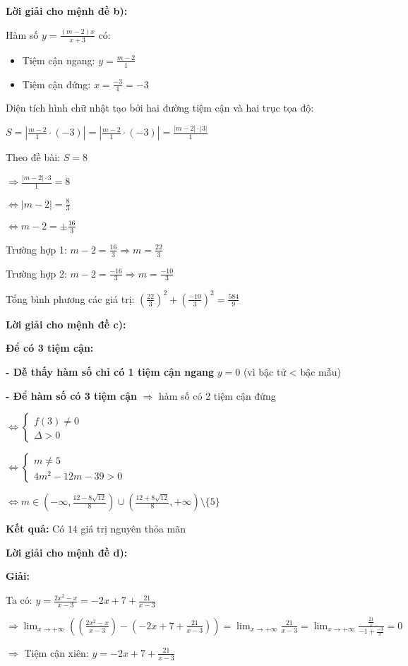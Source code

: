 \documentclass{article}
\begin{document}
\textbf{Lời giải cho mệnh đề b):}

Hàm số \(y = \frac{(m - 2)x}{x + 3}\) có:

\begin{itemize}
\item Tiệm cận ngang: \(y = \frac{m - 2}{1}\)
\item Tiệm cận đứng: \(x = \frac{-3}{1} = -3\)
\end{itemize}

Diện tích hình chữ nhật tạo bởi hai đường tiệm cận và hai trục tọa độ:

\(S = \left| \frac{m - 2}{1} \cdot (-3) \right| = \left| \frac{m - 2}{1} \cdot (-3) \right| = \frac{|m - 2| \cdot |3|}{1}\)

Theo đề bài: \(S = 8\)

\(\Rightarrow \frac{|m - 2| \cdot 3}{1} = 8\)

\(\Leftrightarrow |m - 2| = \frac{8}{3}\)

\(\Leftrightarrow m - 2 = \pm \frac{16}{3}\)

Trường hợp 1: \(m - 2 = \frac{16}{3} \Rightarrow m = \frac{22}{3}\)

Trường hợp 2: \(m - 2 = \frac{-16}{3} \Rightarrow m = \frac{-10}{3}\)

Tổng bình phương các giá trị: \((\frac{22}{3})^2 + (\frac{-10}{3})^2 = \frac{584}{9}\)

\textbf{Lời giải cho mệnh đề c):}

\textbf{Để có 3 tiệm cận:}

\textbf{- Dễ thấy hàm số chỉ có 1 tiệm cận ngang} \(y = 0\) (vì bậc tử < bậc mẫu)

\textbf{- Để hàm số có 3 tiệm cận} \(\Rightarrow\) hàm số có 2 tiệm cận đứng

\(\Leftrightarrow \begin{cases}
f(3) \neq 0 \\
\Delta > 0
\end{cases}\)

\(\Leftrightarrow \begin{cases}
m \neq 5 \\
4m^2 - 12m - 39 > 0
\end{cases}\)

\(\Leftrightarrow m \in (-\infty, \frac{12 - 8\sqrt{12}}{8}) \cup (\frac{12 + 8\sqrt{12}}{8}, +\infty) \setminus \{5\}\)

\textbf{Kết quả:} Có \(14\) giá trị nguyên thỏa mãn

\textbf{Lời giải cho mệnh đề d):}

\textbf{Giải:}

Ta có: \(y = \frac{2x^2 - x}{x - 3} = -2x + 7 + \frac{21}{x - 3}\)

\(\Rightarrow \displaystyle\lim_{x \to +\infty} \left(\left(\frac{2x^2 - x}{x - 3}\right) - \left(-2x + 7 + \frac{21}{x - 3}\right)\right) = \displaystyle\lim_{x \to +\infty} \frac{21}{x - 3} = \displaystyle\lim_{x \to +\infty} \frac{\frac{21}{x}}{-1 + \frac{-3}{x}} = 0\)

\(\Rightarrow\) Tiệm cận xiên: \(y = -2x + 7 + \frac{21}{x - 3}\)
\end{document}
